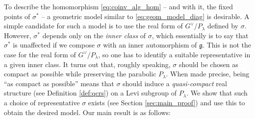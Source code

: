 \documentclass{amsart}
\newcommand{\g}{\mathfrak{g}}
\theoremstyle{definition}
\theoremstyle{plain}
\theoremstyle{remark}
\begin{document}
To describe the homomorphism \eqref{eq:coinv_alg_hom} -- and with it, the fixed points of $\sigma^*$ -- a geometric model similar to \eqref{eq:geom_model_diag} is desirable. A simple candidate for such a model is to use the real form of $G^\vee/P_\lambda$ defined by $\sigma$. However, $\sigma^*$ depends only on the \emph{inner class} of $\sigma$, which essentially is to say that $\sigma^*$ is unaffected if we compose $\sigma$ with an inner automorphism of $\g$. This is not the case for the real form of $G^\vee/P_\lambda$, so one has to identify a suitable representative in a given inner class. It turns out that, roughly speaking, $\sigma$ should be chosen as compact as possible while preserving the parabolic $P_\lambda$. When made precise, being ``as compact as possible'' means that $\sigma$ should induce a \emph{quasi-compact} real structure (see Definition \ref{def:qcrs}) on a Levi subgroup of $P_\lambda$. We show that such a choice of representative $\sigma$ exists (see Section \ref{sec:main_proof}) and use this to obtain the desired model. Our main result is as follows:
\end{document}
